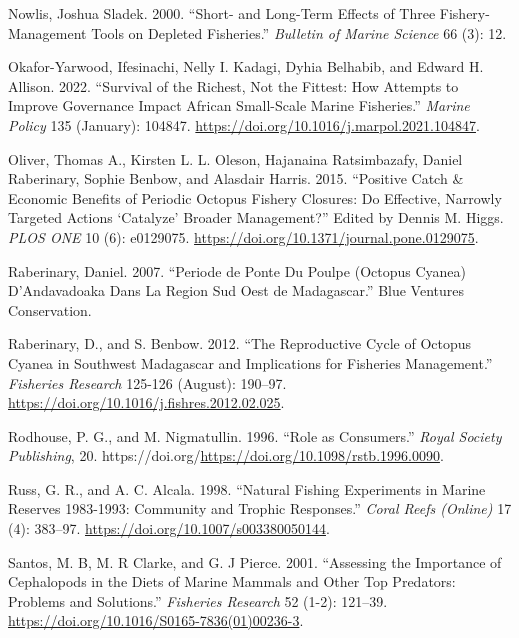 \documentclass[
]{article}
\newlength{\cslhangindent}
\newlength{\cslentryspacingunit} %
\newenvironment{CSLReferences}[2] %
 {%
  \setlength{\parindent}{0pt}
  \ifodd #1
  \let\oldpar\par
  \def\par{\hangindent=\cslhangindent\oldpar}
  \fi
  \setlength{\parskip}{#2\cslentryspacingunit}
 }%
 {}
\begin{document}
\begin{CSLReferences}{1}{0}
\leavevmode{}%
Nowlis, Joshua Sladek. 2000. {``Short- and Long-Term Effects of Three Fishery-Management Tools on Depleted Fisheries.''} \emph{Bulletin of Marine Science} 66 (3): 12.

\leavevmode{}%
Okafor-Yarwood, Ifesinachi, Nelly I. Kadagi, Dyhia Belhabib, and Edward H. Allison. 2022. {``Survival of the {Richest}, Not the {Fittest}: {How} Attempts to Improve Governance Impact {African} Small-Scale Marine Fisheries.''} \emph{Marine Policy} 135 (January): 104847. \url{https://doi.org/10.1016/j.marpol.2021.104847}.

\leavevmode{}%
Oliver, Thomas A., Kirsten L. L. Oleson, Hajanaina Ratsimbazafy, Daniel Raberinary, Sophie Benbow, and Alasdair Harris. 2015. {``Positive {Catch} \& {Economic} {Benefits} of {Periodic} {Octopus} {Fishery} {Closures}: {Do} {Effective}, {Narrowly} {Targeted} {Actions} {`{Catalyze}'} {Broader} {Management}?''} Edited by Dennis M. Higgs. \emph{PLOS ONE} 10 (6): e0129075. \url{https://doi.org/10.1371/journal.pone.0129075}.

\leavevmode{}%
Raberinary, Daniel. 2007. {``Periode de Ponte Du Poulpe ({Octopus} Cyanea) {D}'{Andavadoaka} Dans La Region Sud Oest de {Madagascar}.''} Blue Ventures Conservation.

\leavevmode{}%
Raberinary, D., and S. Benbow. 2012. {``The Reproductive Cycle of {Octopus} Cyanea in Southwest {Madagascar} and Implications for Fisheries Management.''} \emph{Fisheries Research} 125-126 (August): 190--97. \url{https://doi.org/10.1016/j.fishres.2012.02.025}.

\leavevmode{}%
Rodhouse, P. G., and M. Nigmatullin. 1996. {``Role as Consumers.''} \emph{Royal Society Publishing}, 20. https://doi.org/\url{https://doi.org/10.1098/rstb.1996.0090}.

\leavevmode{}%
Russ, G. R., and A. C. Alcala. 1998. {``Natural Fishing Experiments in Marine Reserves 1983-1993: Community and Trophic Responses.''} \emph{Coral Reefs (Online)} 17 (4): 383--97. \url{https://doi.org/10.1007/s003380050144}.

\leavevmode{}%
Santos, M. B, M. R Clarke, and G. J Pierce. 2001. {``Assessing the Importance of Cephalopods in the Diets of Marine Mammals and Other Top Predators: Problems and Solutions.''} \emph{Fisheries Research} 52 (1-2): 121--39. \url{https://doi.org/10.1016/S0165-7836(01)00236-3}.


\end{CSLReferences}
\end{document}
